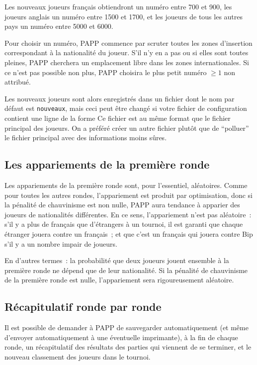 \documentclass[10pt]{article}
\begin{document}
	Les nouveaux joueurs fran{\c c}ais obtiendront un num\'ero entre
700 et 900, les joueurs anglais un num\'ero entre 1500 et 1700, et les
joueurs de tous les autres pays un num\'ero entre 5000 et 6000.

	Pour choisir un num\'ero, PAPP commence par scruter toutes les
zones d'insertion correspondant \`a la nationalit\'e du joueur. S'il n'y
en a pas ou si elles sont toutes pleines, PAPP cherchera un emplacement
libre dans les zones internationales. Si ce n'est pas possible non plus,
PAPP choisira le plus petit num\'ero $\ge1$ non attribu\'e.

	Les nouveaux joueurs sont alors enregistr\'es dans un fichier
dont le nom par d\'efaut est \verb|nouveaux|, mais ceci peut \^etre
chang\'e si votre fichier de configuration contient une ligne de la
forme
\medbreak
Ce fichier est au m\^eme format que le fichier principal des joueurs. On a
pr\'ef\'er\'e cr\'eer un autre fichier plut\^ot que de ``polluer'' le fichier
principal avec des informations moins s\^ures.

\subsection{Les appariements de la premi\`ere ronde}

	Les appariements de la premi\`ere ronde sont, pour l'essentiel,
al\'eatoires.  Comme pour toutes les autres rondes, l'appariement est
produit par optimisation, donc si la p\'enalit\'e de chauvinisme est non
nulle, PAPP aura tendance \`a apparier des joueurs de nationalit\'es
diff\'erentes.  En ce sens, l'appariement n'est pas al\'eatoire~: s'il y
a plus de fran{\c c}ais que d'\'etrangers \`a un tournoi, il est garanti
que chaque \'etranger jouera contre un fran{\c c}ais~; et que c'est un
fran{\c c}ais qui jouera contre Bip s'il y a un nombre impair de
joueurs. 

	En d'autres termes~: la probabilit\'e que deux joueurs jouent
ensemble \`a la premi\`ere ronde ne d\'epend que de leur nationalit\'e. 
Si la p\'enalit\'e de chauvinisme de la premi\`ere ronde est nulle,
l'appariement sera rigoureusement al\'eatoire. 

\subsection{R\'ecapitulatif ronde par ronde}

Il est possible de demander \`a PAPP de sauvegarder automatiquement 
(et m\^eme d'envoyer automatiquement \`a une \'eventuelle imprimante), 
\`a la fin de chaque ronde, un r\'ecapitulatif des r\'esultats des 
parties qui viennent de se terminer, et le nouveau classement des 
joueurs dans le tournoi.
\end{document}
